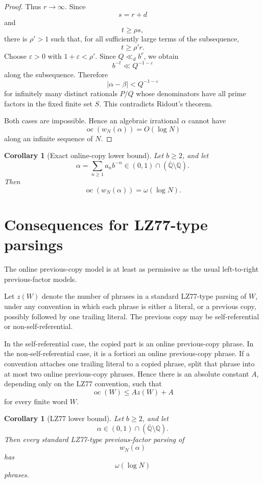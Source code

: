 \documentclass[11pt]{amsart}
\newtheorem{corollary}[theorem]{Corollary}
\theoremstyle{definition}
\DeclareMathOperator{\oc}{oc}
\begin{document}
\begin{proof}
Thus \(r\to\infty\). Since
\[
s=r+d
\]
and
\[
t\geq \rho s,
\]
there is \(\rho'>1\) such that, for all sufficiently large terms of the subsequence,
\[
t\geq \rho' r.
\]
Choose \(\varepsilon>0\) with \(1+\varepsilon<\rho'\). Since \(Q\ll_d b^r\), we obtain
\[
b^{-t}\ll Q^{-1-\varepsilon}
\]
along the subsequence. Therefore
\[
|\alpha-\beta|<Q^{-1-\varepsilon}
\]
for infinitely many distinct rationals \(P/Q\) whose denominators have all prime factors in the fixed finite set \(S\). This contradicts Ridout's theorem.

Both cases are impossible. Hence an algebraic irrational \(\alpha\) cannot have
\[
\oc(w_N(\alpha))=O(\log N)
\]
along an infinite sequence of \(N\).
\end{proof}

\begin{corollary}[Exact online-copy lower bound]
Let \(b\geq 2\), and let
\[
\alpha=\sum_{n\geq 1}a_n b^{-n}
\in(0,1)\cap(\overline{\mathbb Q}\setminus\mathbb Q).
\]
Then
\[
\oc(w_N(\alpha))=\omega(\log N).
\]
\end{corollary}

\section{Consequences for LZ77-type parsings}

The online previous-copy model is at least as permissive as the usual left-to-right previous-factor models.

Let \(z(W)\) denote the number of phrases in a standard LZ77-type parsing of \(W\), under any convention in which each phrase is either a literal, or a previous copy, possibly followed by one trailing literal. The previous copy may be self-referential or non-self-referential.

In the self-referential case, the copied part is an online previous-copy phrase. In the non-self-referential case, it is a fortiori an online previous-copy phrase. If a convention attaches one trailing literal to a copied phrase, split that phrase into at most two online previous-copy phrases. Hence there is an absolute constant \(A\), depending only on the LZ77 convention, such that
\[
\oc(W)\leq A z(W)+A
\]
for every finite word \(W\).

\begin{corollary}[LZ77 lower bound]
Let \(b\geq 2\), and let
\[
\alpha\in(0,1)\cap(\overline{\mathbb Q}\setminus\mathbb Q).
\]
Then every standard LZ77-type previous-factor parsing of
\[
w_N(\alpha)
\]
has
\[
\omega(\log N)
\]
phrases.
\end{corollary}
\end{document}
